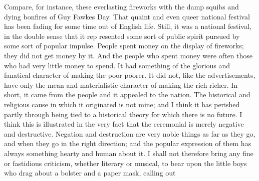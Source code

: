 \documentclass{book}
\begin{document}
Compare, for instance, these everlasting fireworks with the damp squibs and dying bonfires of Guy Fawkes Day. That quaint and even queer national festival has been fading for some time out of English life. Still, it was a national festival, in the double sense that it rep resented some sort of public spirit pursued by some sort of popular impulse. People spent money on the display of fireworks; they did not get money by it. And the people who spent money were often those who had very little money to spend. It had something of the glorious and fanatical character of making the poor poorer. It did not, like the advertisements, have only the mean and materialistic character of making the rich richer. In short, it came from the people and it appealed to the nation. The historical and religious cause in which it originated is not mine; and I think it has perished partly through being tied to a historical theory for which there is no future. I think this is illustrated in the very fact that the ceremonial is merely negative and destructive. Negation and destruction are very noble things as far as they go, and when they go in the right direction; and the popular expression of them has always something hearty and human about it. I shall not therefore bring any fine or fastidious criticism, whether literary or musical, to bear upon the little boys who drag about a bolster and a paper mask, calling out
\end{document}
